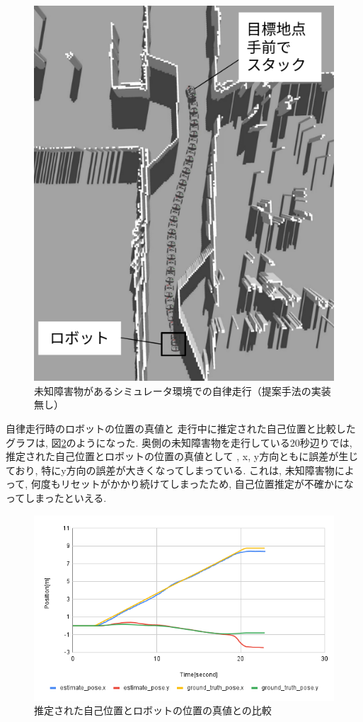 \begin{figure}[H]
  \begin{center}
    \includegraphics[width=0.5\linewidth]{figs/no_implementation_with_reset.png}
    \caption{未知障害物があるシミュレータ環境での自律走行（提案手法の実装無し）}
    \label{fig:nav_no_imp}
  \end{center}
\end{figure}

自律走行時のロボットの位置の真値と
走行中に推定された自己位置と比較したグラフは, 図\ref{fig:odom_comp_no_imp}のようになった. 
奥側の未知障害物を走行している20秒辺りでは, 推定された自己位置とロボットの位置の真値として
, x, y方向ともに誤差が生じており, 特にy方向の誤差が大きくなってしまっている. 
これは, 未知障害物によって, 何度もリセットがかかり続けてしまったため, 自己位置推定が不確かになってしまったといえる. 

\begin{figure}[H]
  \begin{center}
    \includegraphics[width=0.98\linewidth]{figs/sim_no_imp_ground_truth.png}
    \caption{推定された自己位置とロボットの位置の真値との比較}
    \label{fig:odom_comp_no_imp}
  \end{center}
\end{figure}

